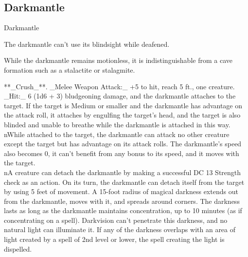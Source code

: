 \subsection{Darkmantle}
\begin{DndMonster}[float*=b,width=\textwidth + 8pt]{Darkmantle}
\begin{multicols}{2}
\DndMonsterBasics[armor-class={11}, hit-points={22 (5d6 + 5)}, speed={10 ft., fly 30 ft.}]
\DndMonsterDetails[saving-throws={}, skills={Stealth +3}, damage-immunities={}, damage-resistances={}, damage-vulnerabilities={}, condition-immunities={}, senses={blindsight 60 ft., passive Perception 10}, languages={—}, challenge={1/2 (100 XP)}]
 The darkmantle can’t use its blindsight while deafened.

 While the darkmantle remains motionless, it is indistinguishable from a cave formation such as a stalactite or stalagmite.

**_Crush_**. _Melee Weapon Attack:_ +5 to hit, reach 5 ft., one creature. _Hit:_ 6 (1d6 + 3) bludgeoning damage, and the darkmantle attaches to the target. If the target is Medium or smaller and the darkmantle has advantage on the attack roll, it attaches by engulfing the target’s head, and the target is also blinded and unable to breathe while the darkmantle is attached in this way.\\nWhile attached to the target, the darkmantle can attack no other creature except the target but has advantage on its attack rolls. The darkmantle’s speed also becomes 0, it can’t benefit from any bonus to its speed, and it moves with the target.\\nA creature can detach the darkmantle by making a successful DC 13 Strength check as an action. On its turn, the darkmantle can detach itself from the target by using 5 feet of movement.
A 15-foot radius of magical darkness extends out from the darkmantle, moves with it, and spreads around corners. The darkness lasts as long as the darkmantle maintains concentration, up to 10 minutes (as if concentrating on a spell). Darkvision can’t penetrate this darkness, and no natural light can illuminate it. If any of the darkness overlaps with an area of light created by a spell of 2nd level or lower, the spell creating the light is dispelled.
\end{multicols}
\end{DndMonster}
